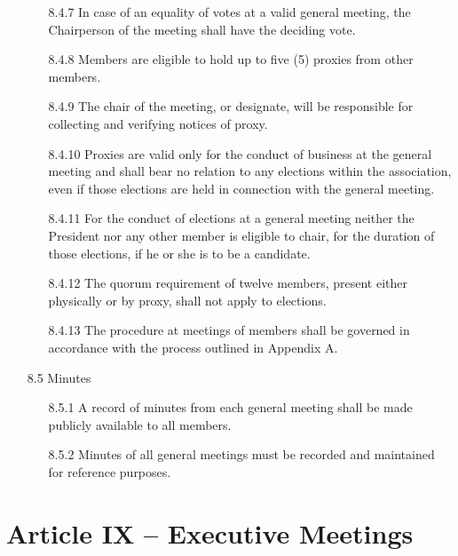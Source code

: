 \documentclass[12pt,a4paper]{article}
\begin{document}
\begin{enumerate}
\begin{enumerate}
\item[8.4.7] In case of an equality of votes at a valid general meeting, the Chairperson of the meeting shall have the deciding vote.

\item[8.4.8] Members are eligible to hold up to five (5) proxies from other members. 

\item[8.4.9] The chair of the meeting, or designate, will be responsible for collecting and verifying notices of proxy.

\item[8.4.10] Proxies are valid only for the conduct of business at the general meeting and shall bear no relation to any elections within the association, even if those elections are held in connection with the general meeting.

\item[8.4.11] For the conduct of elections at a general meeting neither the President nor any other member is eligible to chair, for the duration of those elections, if he or she is to be a candidate.

\item[8.4.12] The quorum requirement of twelve members, present either physically or by proxy, shall not apply to elections.

\item[8.4.13] The procedure at meetings of members shall be governed in accordance with the process outlined in
Appendix A.
\end{enumerate}

\item[8.5] Minutes

\begin{enumerate}
\item[8.5.1] A record of minutes from each general meeting shall be made publicly available to all members.

\item[8.5.2] Minutes of all general meetings must be recorded and maintained for reference purposes.
\end{enumerate}
\end{enumerate}

\section*{Article IX – Executive Meetings}
\end{document}
